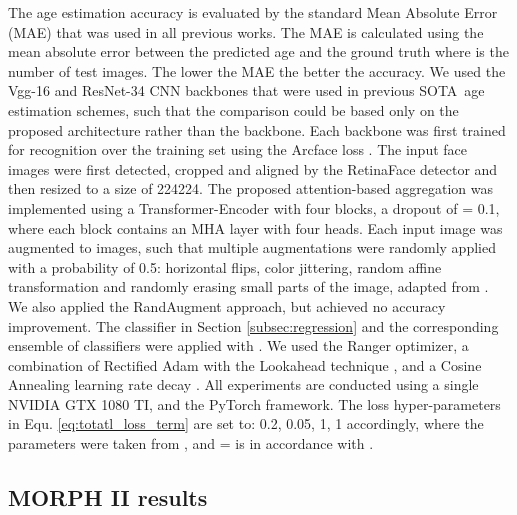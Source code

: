 \documentclass[10pt,twocolumn,letterpaper]{article}
\begin{document}
The age estimation accuracy is evaluated by the standard Mean Absolute Error
(MAE) that was used in all previous works. The MAE is calculated using the
mean absolute error between the predicted age  and the
ground truth where  is the number of test images. The lower the MAE the better the
accuracy. We used the Vgg-16 \cite{vgg} and ResNet-34 \cite{7780459} CNN
backbones that were used in previous SOTA\ age estimation schemes, such that
the comparison could be based only on the proposed architecture rather than
the backbone. Each backbone was first trained for recognition over the
training set using the Arcface loss \cite{8953658}. The input face images
were first detected, cropped and aligned by the RetinaFace detector \cite {RetinaFace} and then resized to a size of 224224. The proposed
attention-based aggregation was implemented using a Transformer-Encoder with
four blocks, a dropout of  = 0.1, where each block contains an MHA layer
with four heads. Each input image was augmented to \thinspace images, such that multiple augmentations were randomly applied with a
probability of 0.5: horizontal flips, color jittering, random affine
transformation and randomly erasing small parts of the image, adapted from
\cite{8954382}. We also applied the RandAugment \cite{Randaugment} approach,
but achieved no accuracy improvement. The classifier in Section \ref {subsec:regression} and the corresponding ensemble of classifiers  were applied with
. We used the
Ranger optimizer, a combination of Rectified Adam \cite{Liu2020OnTV} with
the Lookahead technique \cite{Lookahead}, and a Cosine Annealing learning
rate decay \cite{SGDR}. All experiments are conducted using a single NVIDIA
GTX 1080 TI, and the PyTorch framework. The loss hyper-parameters  in Equ. \ref{eq:totatl_loss_term} are set to: {0.2, 0.05, 1, 1}
accordingly, where the parameters 
were taken from \cite{Mean-Variance}, and = is in
accordance with .

\subsection{MORPH II results}

\label{subsec:morph AFAD}
\end{document}
